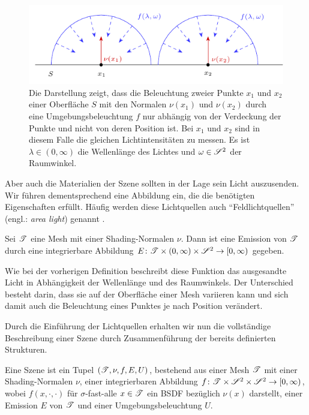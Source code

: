 		\begin{figure}
			\center
			\includegraphics{gg_fig/hdr_environment_map_1.pdf}
			\caption[Wirkungsweise einer Umgebungsbeleuchtung]{Die Darstellung zeigt, dass die Beleuchtung zweier Punkte $x_1$ und $x_2$ einer Oberfläche $S$ mit den Normalen $\nu(x_1)$ und $\nu(x_2)$ durch eine Umgebungsbeleuchtung $f$ nur abhängig von der Verdeckung der Punkte und nicht von deren Position ist. Bei $x_1$ und $x_2$ sind in diesem Falle die gleichen Lichtintensitäten zu messen. Es ist $\lambda\in(0,\infty)$ die Wellenlänge des Lichtes und $\omega\in\mathscr{S}^{2}$ der Raumwinkel.}
			\label{fig:hdr_environment_map}
		\end{figure}

		Aber auch die Materialien der Szene sollten in der Lage sein Licht auszusenden.
		Wir führen dementsprechend eine Abbildung ein, die die benötigten Eigenschaften erfüllt.
		Häufig werden diese Lichtquellen auch \enquote{Feldlichtquellen} (engl.: \textit{area light}) genannt \cite[S.~733~ff]{pbrt3}.
		\begin{definition}[Emission]
			Sei $\mathscr{T}$ eine Mesh mit einer Shading-Normalen $\nu$.
			Dann ist eine Emission von $\mathscr{T}$ durch eine integrierbare Abbildung $E\colon\mathscr{T}\times(0,\infty)\times\mathscr{S}^{2}\to[0,\infty)$ gegeben.
		\end{definition}

		Wie bei der vorherigen Definition beschreibt diese Funktion das ausgesandte Licht in Abhängigkeit der Wellenlänge und des Raumwinkels.
		Der Unterschied besteht darin, dass sie auf der Oberfläche einer Mesh variieren kann und sich damit auch die Beleuchtung eines Punktes je nach Position verändert.

		Durch die Einführung der Lichtquellen erhalten wir nun die vollständige Beschreibung einer Szene durch Zusammenführung der bereits definierten Strukturen.
		\begin{definition}[Szene]
			Eine Szene ist ein Tupel $(\mathscr{T},\nu,f,E,U)$, bestehend aus einer Mesh $\mathscr{T}$ mit einer Shading-Normalen $\nu$, einer integrierbaren Abbildung $f\colon\mathscr{T}\times\mathscr{S}^{2}\times\mathscr{S}^{2}\to[0,\infty)$, wobei $f(x,\cdot,\cdot)$ für $\sigma$-fast-alle $x\in\mathscr{T}$ ein BSDF bezüglich $\nu(x)$ darstellt, einer Emission $E$ von $\mathscr{T}$ und einer Umgebungsbeleuchtung $U$.
		\end{definition}

